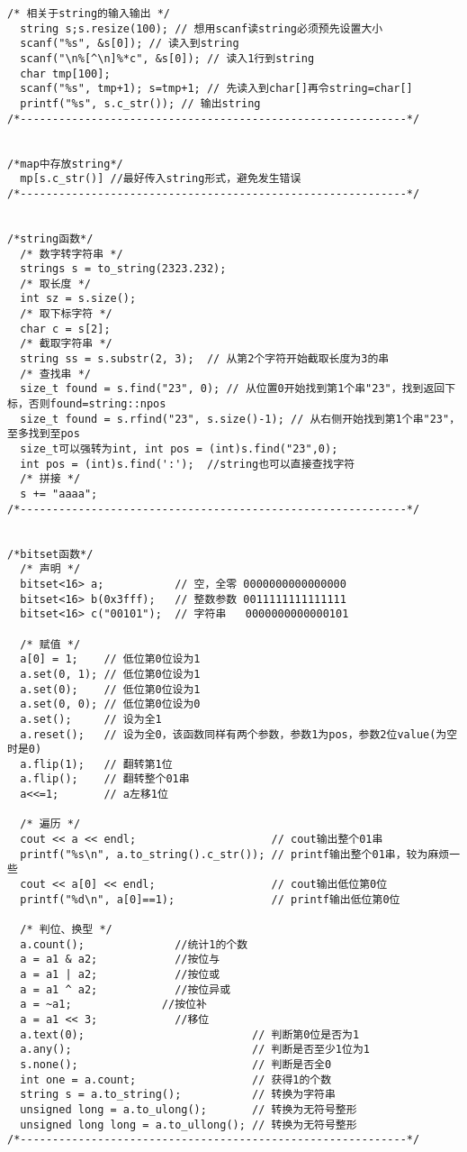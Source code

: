 \documentclass[twoside]{article}
\begin{document}
\begin{lstlisting}
/* 相关于string的输入输出 */
  string s;s.resize(100); // 想用scanf读string必须预先设置大小
  scanf("%s", &s[0]); // 读入到string
  scanf("\n%[^\n]%*c", &s[0]); // 读入1行到string
  char tmp[100];
  scanf("%s", tmp+1); s=tmp+1; // 先读入到char[]再令string=char[]
  printf("%s", s.c_str()); // 输出string
/*------------------------------------------------------------*/


/*map中存放string*/
  mp[s.c_str()] //最好传入string形式，避免发生错误
/*------------------------------------------------------------*/


/*string函数*/
  /* 数字转字符串 */
  strings s = to_string(2323.232);
  /* 取长度 */
  int sz = s.size();
  /* 取下标字符 */
  char c = s[2];
  /* 截取字符串 */
  string ss = s.substr(2, 3);  // 从第2个字符开始截取长度为3的串
  /* 查找串 */
  size_t found = s.find("23", 0); // 从位置0开始找到第1个串"23"，找到返回下标，否则found=string::npos
  size_t found = s.rfind("23", s.size()-1); // 从右侧开始找到第1个串"23"，至多找到至pos
  size_t可以强转为int, int pos = (int)s.find("23",0);
  int pos = (int)s.find(':');  //string也可以直接查找字符
  /* 拼接 */
  s += "aaaa";
/*------------------------------------------------------------*/


/*bitset函数*/
  /* 声明 */
  bitset<16> a;           // 空，全零 0000000000000000
  bitset<16> b(0x3fff);   // 整数参数 0011111111111111
  bitset<16> c("00101");  // 字符串   0000000000000101

  /* 赋值 */
  a[0] = 1;    // 低位第0位设为1
  a.set(0, 1); // 低位第0位设为1
  a.set(0);    // 低位第0位设为1
  a.set(0, 0); // 低位第0位设为0
  a.set();     // 设为全1
  a.reset();   // 设为全0，该函数同样有两个参数，参数1为pos，参数2位value(为空时是0)
  a.flip(1);   // 翻转第1位
  a.flip();    // 翻转整个01串
  a<<=1;       // a左移1位

  /* 遍历 */
  cout << a << endl;                     // cout输出整个01串
  printf("%s\n", a.to_string().c_str()); // printf输出整个01串，较为麻烦一些
  cout << a[0] << endl;                  // cout输出低位第0位
  printf("%d\n", a[0]==1);               // printf输出低位第0位

  /* 判位、换型 */
  a.count();              //统计1的个数
  a = a1 & a2;            //按位与
  a = a1 | a2;            //按位或
  a = a1 ^ a2;            //按位异或
  a = ~a1;              //按位补
  a = a1 << 3;            //移位
  a.text(0);                          // 判断第0位是否为1
  a.any();                            // 判断是否至少1位为1
  s.none();                           // 判断是否全0
  int one = a.count;                  // 获得1的个数
  string s = a.to_string();           // 转换为字符串
  unsigned long = a.to_ulong();       // 转换为无符号整形
  unsigned long long = a.to_ullong(); // 转换为无符号整形
/*------------------------------------------------------------*/



\end{lstlisting}
\end{document}
